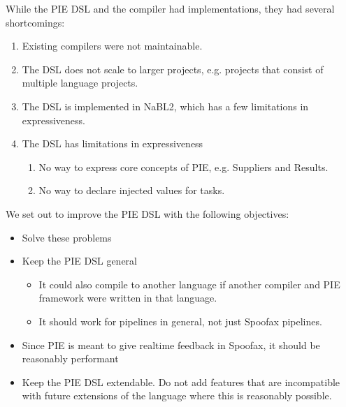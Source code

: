 While the \ac{PIE} \ac{DSL} and the compiler had implementations, they had several shortcomings:
\begin{enumerate}
  \item Existing compilers were not maintainable.
  \item The \ac{DSL} does not scale to larger projects, e.g. projects that consist of multiple language projects.
  \item The \ac{DSL} is implemented in NaBL2, which has a few limitations in expressiveness.
  \item The \ac{DSL} has limitations in expressiveness
  \begin{enumerate}
    \item No way to express core concepts of \ac{PIE}, e.g. Suppliers and Results.
    \item No way to declare injected values for tasks.
  \end{enumerate}
\end{enumerate}

We set out to improve the \ac{PIE} \ac{DSL} with the following objectives:
\begin{itemize}
  \item Solve these problems
  \item Keep the \ac{PIE} \ac{DSL} general
  \begin{itemize}
    \item It could also compile to another language if another compiler and \ac{PIE} framework were written in that language.
    \item It should work for pipelines in general, not just Spoofax pipelines.
  \end{itemize}
  \item Since \ac{PIE} is meant to give realtime feedback in Spoofax, it should be reasonably performant
  \item Keep the \ac{PIE} \ac{DSL} extendable. Do not add features that are incompatible with future extensions of the language where this is reasonably possible.
\end{itemize}

